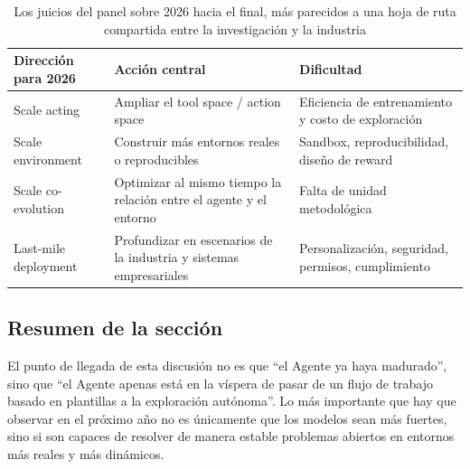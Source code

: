 \begin{table}[H]
\centering
\begin{tabular}{p{3.1cm}p{4.1cm}p{4.4cm}}
\toprule
\textbf{Dirección para 2026} & \textbf{Acción central} & \textbf{Dificultad} \\
\midrule
Scale acting & Ampliar el tool space / action space & Eficiencia de entrenamiento y costo de exploración \\
Scale environment & Construir más entornos reales o reproducibles & Sandbox, reproducibilidad, diseño de reward \\
Scale co-evolution & Optimizar al mismo tiempo la relación entre el agente y el entorno & Falta de unidad metodológica \\
Last-mile deployment & Profundizar en escenarios de la industria y sistemas empresariales & Personalización, seguridad, permisos, cumplimiento \\
\bottomrule
\end{tabular}
\caption{Los juicios del panel sobre 2026 hacia el final, más parecidos a una hoja de ruta compartida entre la investigación y la industria}
\end{table}

\subsection{Resumen de la sección}
El punto de llegada de esta discusión no es que ``el Agente ya haya madurado'', sino que ``el Agente apenas está en la víspera de pasar de un flujo de trabajo basado en plantillas a la exploración autónoma''. Lo más importante que hay que observar en el próximo año no es únicamente que los modelos sean más fuertes, sino si son capaces de resolver de manera estable problemas abiertos en entornos más reales y más dinámicos.
